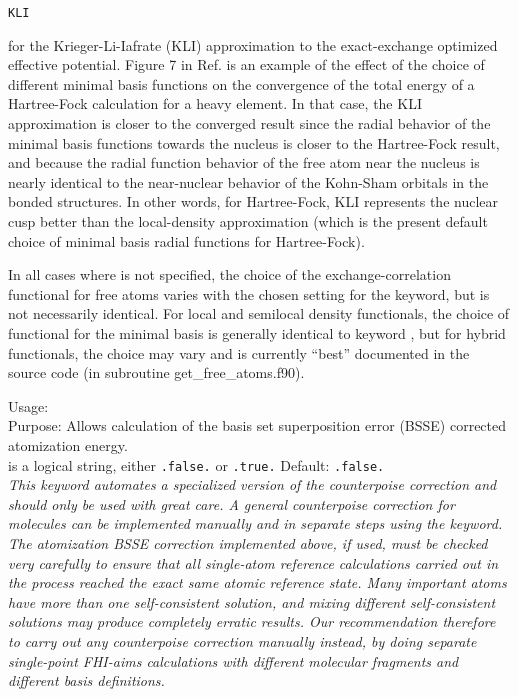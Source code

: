 \texttt{KLI}

for the Krieger-Li-Iafrate (KLI) approximation
\cite{Krieger1990,Krieger1992a,Krieger1992b} to the exact-exchange
optimized effective potential. Figure 7 in Ref. \cite{Ren12a} is an
example of the effect of the choice of different minimal basis
functions on the convergence of the total energy of a Hartree-Fock
calculation for a heavy element. In that case, the KLI approximation
is closer to the converged result since the radial behavior of the
minimal basis functions towards the nucleus is closer to the
Hartree-Fock result, and because the radial function behavior of the
free atom near the nucleus is nearly identical to the near-nuclear
behavior of the Kohn-Sham orbitals in the bonded structures. In other
words, for Hartree-Fock, KLI represents the nuclear cusp better than
the local-density approximation (which is the present default choice
of minimal basis radial functions for Hartree-Fock). 

In all cases where  is not specified, the
choice of the exchange-correlation functional for free atoms varies
with the chosen setting for the  keyword, but is not
necessarily identical. For local and semilocal density functionals,
the choice of functional for the minimal basis is generally identical
to keyword , but for hybrid functionals, the choice may
vary and is currently ``best'' documented in the source code (in
subroutine get\_free\_atoms.f90).


{\noindent
  Usage:   \\[1.0ex]
  Purpose: Allows calculation of the basis set superposition error
  (BSSE) corrected atomization energy. 
  \\[1.0ex]
   is a logical string, either \texttt{.false.} or
    \texttt{.true.} Default: \texttt{.false.}  \\
}
\textit{This keyword automates a specialized version of the
  counterpoise correction and should only be used with great care. A
  general counterpoise correction for molecules can be implemented
  manually and in separate steps using the 
  keyword. The atomization BSSE correction implemented above, if used, must be
  checked very carefully to ensure that all single-atom reference
  calculations carried out in the process reached the exact same
  atomic reference state. Many important atoms have more than one
  self-consistent solution, and mixing different self-consistent
  solutions may produce completely erratic results. Our recommendation
  therefore to carry out any counterpoise correction manually instead,
  by doing separate single-point FHI-aims calculations with different
  molecular fragments and different basis definitions.} 

